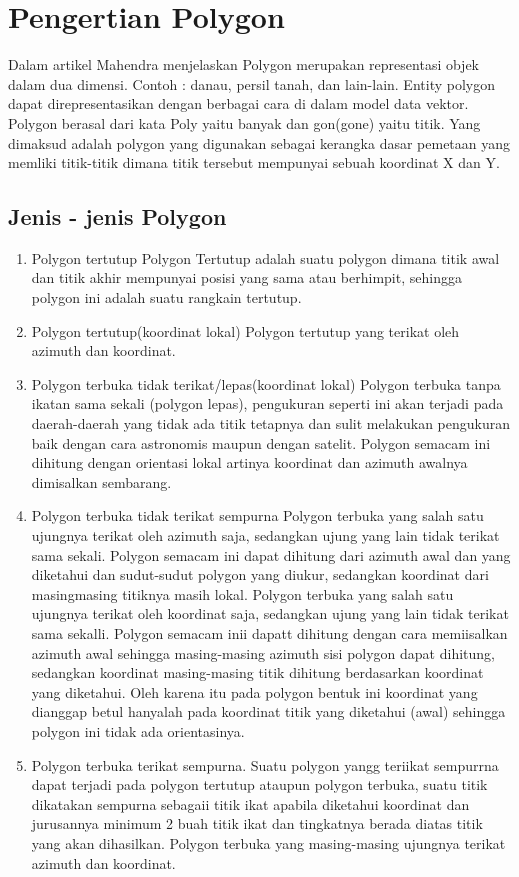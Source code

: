 \section{Pengertian Polygon}
Dalam artikel Mahendra menjelaskan Polygon merupakan representasi objek dalam dua dimensi. Contoh : danau,
persil tanah, dan lain-lain. Entity polygon dapat direpresentasikan dengan berbagai cara di dalam model data vektor. 
Polygon berasal dari kata Poly yaitu banyak dan gon(gone) yaitu titik. Yang dimaksud adalah polygon yang digunakan sebagai kerangka dasar pemetaan yang memliki titik-titik dimana titik tersebut mempunyai sebuah koordinat X dan Y. 

\subsection{Jenis - jenis Polygon}
\begin{enumerate}
\item Polygon tertutup
  Polygon Tertutup adalah suatu polygon dimana titik awal dan titik akhir mempunyai posisi yang sama atau berhimpit, sehingga polygon ini adalah suatu rangkain tertutup.
\item Polygon tertutup(koordinat lokal)
  Polygon tertutup yang terikat oleh azimuth dan koordinat.
\item Polygon terbuka tidak terikat/lepas(koordinat lokal)
  Polygon terbuka tanpa ikatan sama sekali (polygon lepas), pengukuran seperti ini akan terjadi pada daerah-daerah yang tidak ada titik tetapnya dan sulit melakukan pengukuran baik dengan cara astronomis maupun dengan satelit. Polygon semacam ini dihitung dengan orientasi lokal artinya koordinat dan azimuth awalnya dimisalkan sembarang.
\item Polygon terbuka tidak terikat sempurna
  Polygon terbuka yang salah satu ujungnya terikat oleh azimuth saja, sedangkan ujung yang lain tidak terikat sama sekali. Polygon semacam ini dapat dihitung dari azimuth awal dan yang diketahui dan sudut-sudut polygon yang diukur, sedangkan koordinat dari masingmasing titiknya masih lokal. Polygon terbuka yang salah satu ujungnya terikat oleh koordinat saja, sedangkan ujung yang lain tidak terikat sama sekalli. Polygon semacam inii dapatt dihitung dengan cara memiisalkan azimuth awal sehingga masing-masing azimuth sisi polygon dapat dihitung, sedangkan koordinat masing-masing titik dihitung berdasarkan koordinat yang diketahui. Oleh karena itu pada polygon bentuk ini koordinat yang dianggap betul hanyalah pada koordinat titik yang diketahui (awal) sehingga polygon ini tidak ada orientasinya.
\item Polygon terbuka terikat sempurna.
  Suatu polygon yangg teriikat sempurrna dapat terjadi pada polygon tertutup ataupun polygon terbuka, suatu titik dikatakan sempurna sebagaii titik ikat apabila diketahui koordinat dan jurusannya minimum 2 buah titik ikat dan tingkatnya berada diatas titik yang akan dihasilkan. Polygon terbuka yang masing-masing ujungnya terikat azimuth dan koordinat.
\end{enumerate}

